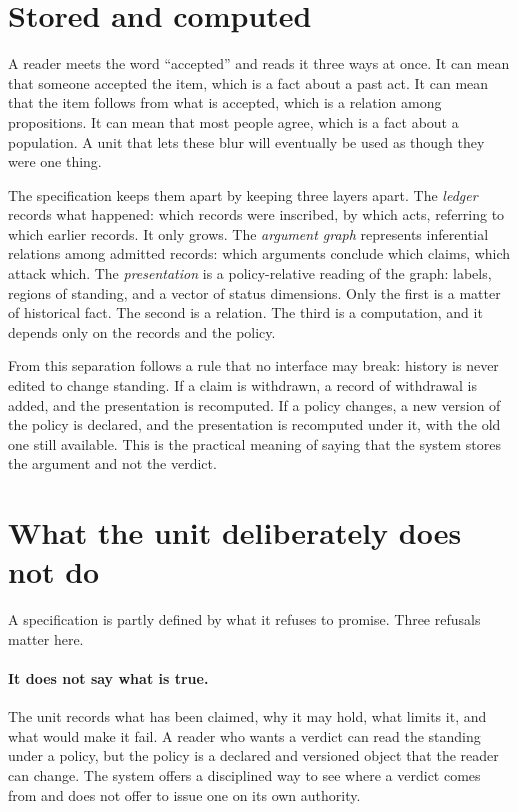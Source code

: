 \documentclass[11pt]{article}
\begin{document}
\section{Stored and computed}\label{sec:layers}

A reader meets the word ``accepted'' and reads it three ways at once. It can mean that someone accepted the item, which is a fact about a past act. It can mean that the item follows from what is accepted, which is a relation among propositions. It can mean that most people agree, which is a fact about a population. A unit that lets these blur will eventually be used as though they were one thing.

The specification keeps them apart by keeping three layers apart. The \emph{ledger} records what happened: which records were inscribed, by which acts, referring to which earlier records. It only grows. The \emph{argument graph} represents inferential relations among admitted records: which arguments conclude which claims, which attack which. The \emph{presentation} is a policy-relative reading of the graph: labels, regions of standing, and a vector of status dimensions. Only the first is a matter of historical fact. The second is a relation. The third is a computation, and it depends only on the records and the policy.

From this separation follows a rule that no interface may break: history is never edited to change standing. If a claim is withdrawn, a record of withdrawal is added, and the presentation is recomputed. If a policy changes, a new version of the policy is declared, and the presentation is recomputed under it, with the old one still available. This is the practical meaning of saying that the system stores the argument and not the verdict.

\section{What the unit deliberately does not do}\label{sec:refusals}

A specification is partly defined by what it refuses to promise. Three refusals matter here.

\paragraph{It does not say what is true.} The unit records what has been claimed, why it may hold, what limits it, and what would make it fail. A reader who wants a verdict can read the standing under a policy, but the policy is a declared and versioned object that the reader can change. The system offers a disciplined way to see where a verdict comes from and does not offer to issue one on its own authority.
\end{document}
